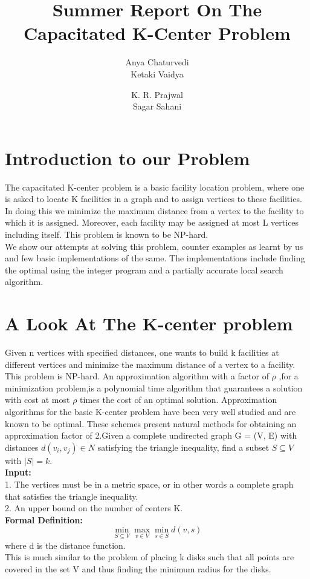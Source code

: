\documentclass[12pt,a4paper,onecolumn]{article}
\author{Anya Chaturvedi \\ Ketaki Vaidya \and K. R. Prajwal \\ Sagar Sahani }
\title{Summer Report On The Capacitated K-Center Problem}
\begin{document}
\maketitle
\section{Introduction to our Problem}
The capacitated K-center problem is a basic facility location problem, where one is asked to locate K facilities in a graph and to assign vertices to these facilities. In doing this we minimize
the maximum distance from a vertex to the facility to which it is assigned. Moreover, each facility
may be assigned at most L vertices including itself. This problem is known to be NP-hard.\\
We show our attempts at solving this problem, counter examples as learnt by us and few basic implementations of the same. The implementations include finding the optimal using the integer program and a partially accurate local search algorithm.
\section{A Look At The K-center problem}
Given n vertices with specified distances, one wants to build k facilities at different vertices and minimize the maximum distance of a vertex to a facility. This problem is NP-hard. An approximation algorithm with a factor of $\rho$ ,for a minimization problem,is
a polynomial time algorithm that guarantees a solution with cost at most $\rho$ times
the cost of an optimal solution. Approximation algorithms for the basic K-center
problem have been very well studied and are known to be optimal.
These schemes present natural methods for obtaining an approximation factor of 2.Given a complete undirected graph G = (V, E) with distances $d(v_i, v_j) \in N$ satisfying the triangle inequality, find a subset $S \subseteq V$ with $|S| = k$.\\ \textbf{Input:}\\1. The vertices must be in a metric space, or in other words a complete graph that satisfies the triangle inequality.\\2. An
upper bound on the number of centers K.\\
\textbf{Formal Definition:}\\
$$\min_{S \subseteq V}\max_{v \in V}\min_{s \in S}d(v,s)$$
where d is the distance function.\\
This is much similar to the problem of placing k disks such that all points are covered in the set V and thus finding the minimum radius for the disks.
\end{document}
